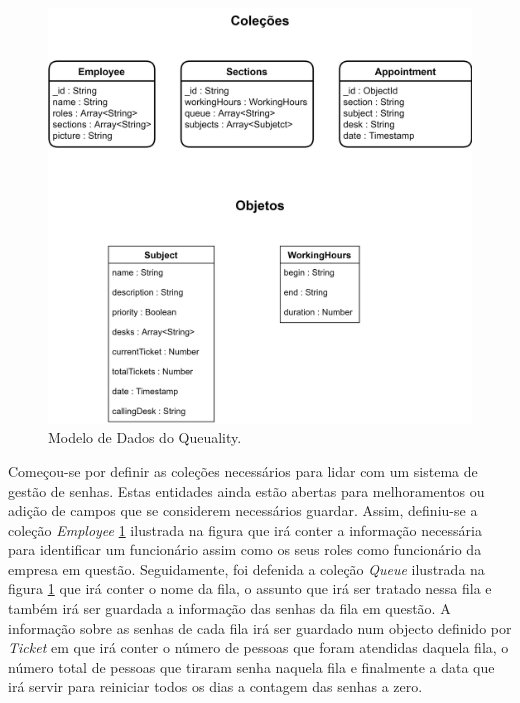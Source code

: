 \documentclass[12pt,a4paper]{article}
\begin{document}
\begin{figure}[h]
    \centering
    \includegraphics[scale=0.75]{Data-Model}
    \caption{Modelo de Dados do Queuality.}
    \label{fig:figure1}
\end{figure}
Começou-se por definir as coleções necessários para lidar com um sistema de gestão de senhas. Estas entidades ainda estão abertas para melhoramentos ou adição de campos
que se considerem necessários guardar. Assim, definiu-se a coleção \textit{Employee} \ref{fig:figure1} ilustrada na figura que irá conter a informação necessária para identificar um funcionário assim 
como os seus roles como funcionário da empresa em questão. Seguidamente, foi defenida a coleção \textit{Queue} ilustrada na figura \ref{fig:figure1} que irá conter o nome da fila, o assunto que irá ser tratado nessa fila
e também irá ser guardada a informação das senhas da fila em questão. A informação sobre as senhas de cada fila irá ser guardado num objecto definido por \textit{Ticket} em que irá conter o número de pessoas que foram atendidas
daquela fila, o número total de pessoas que tiraram senha naquela fila e finalmente a data que irá servir para reiniciar todos os dias a contagem das senhas a zero.
\end{document}
